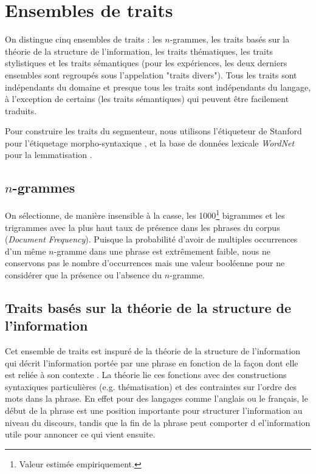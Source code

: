 \section{Ensembles de traits}

On distingue cinq ensembles de traits : les $n$-grammes, les traits basés sur la théorie de la structure de l'information, les traits thématiques, les traits stylistiques et les traits sémantiques (pour les expériences, les deux derniers ensembles sont regroupés sous l'appelation "traits divers"). Tous les traits sont indépendants du domaine et presque tous les traits sont indépendants du langage, à l'exception de certains (les traits sémantiques) qui peuvent être facilement traduits.

Pour construire les traits du segmenteur, nous utilisons l'étiqueteur de Stanford pour l'étiquetage morpho-syntaxique \cite{toutanova2003feature}, et la base de données lexicale \textit{WordNet} pour la lemmatisation \cite{miller1995wordnet}.

\subsection{$n$-grammes}

On sélectionne, de manière insensible à la casse, les 1000\footnote{Valeur estimée empiriquement.} bigrammes et les trigrammes avec la plus haut taux de présence dans les phrases du corpus (\textit{Document Frequency}). Puisque la probabilité d'avoir de multiples occurrences d'un même $n$-gramme dans une phrase est extrêmement faible, nous ne conservons pas le nombre d'occurrences mais une valeur booléenne pour ne considérer que la présence ou l'absence du $n$-gramme.

\subsection{Traits basés sur la théorie de la structure de l'information}

Cet ensemble de traits est inspuré de la théorie de la structure de l'information qui décrit l'information portée par une phrase en fonction de la façon dont elle est reliée à son contexte \cite{kruijff:1996}. La théorie lie ces fonctions avec des constructions syntaxiques particulières (e.g. thématisation) et des contraintes sur l'ordre des mots dans la phrase. En effet pour des langages comme l'anglais ou le français, le début de la phrase est une position importante pour structurer l'information au niveau du discours, tandis que la fin de la phrase peut comporter d el'information utile pour annoncer ce qui vient ensuite. 

